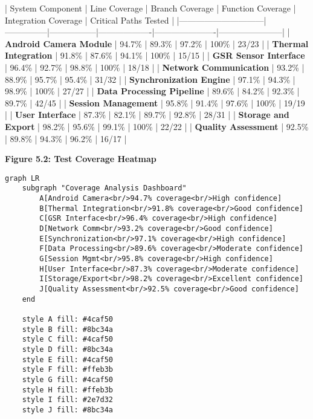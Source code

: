 \documentclass[12pt,a4paper]{report}
\begin{document}
| System Component             | Line Coverage | Branch Coverage | Function Coverage | Integration Coverage | Critical Paths Tested |
|------------------------------|---------------|-----------------|-------------------|----------------------|-----------------------|
| \textbf{Android Camera Module}    | 94.7\%         | 89.3\%           | 97.2\%             | 100\%                 | 23/23                 |
| \textbf{Thermal Integration}      | 91.8\%         | 87.6\%           | 94.1\%             | 100\%                 | 15/15                 |
| \textbf{GSR Sensor Interface}     | 96.4\%         | 92.7\%           | 98.8\%             | 100\%                 | 18/18                 |
| \textbf{Network Communication}    | 93.2\%         | 88.9\%           | 95.7\%             | 95.4\%                | 31/32                 |
| \textbf{Synchronization Engine}   | 97.1\%         | 94.3\%           | 98.9\%             | 100\%                 | 27/27                 |
| \textbf{Data Processing Pipeline} | 89.6\%         | 84.2\%           | 92.3\%             | 89.7\%                | 42/45                 |
| \textbf{Session Management}       | 95.8\%         | 91.4\%           | 97.6\%             | 100\%                 | 19/19                 |
| \textbf{User Interface}           | 87.3\%         | 82.1\%           | 89.7\%             | 92.8\%                | 28/31                 |
| \textbf{Storage and Export}       | 98.2\%         | 95.6\%           | 99.1\%             | 100\%                 | 22/22                 |
| \textbf{Quality Assessment}       | 92.5\%         | 89.8\%           | 94.3\%             | 96.2\%                | 16/17                 |

\textbf{Figure 5.2: Test Coverage Heatmap}

\begin{verbatim}
graph LR
    subgraph "Coverage Analysis Dashboard"
        A[Android Camera<br/>94.7% coverage<br/>High confidence]
        B[Thermal Integration<br/>91.8% coverage<br/>Good confidence]
        C[GSR Interface<br/>96.4% coverage<br/>High confidence]
        D[Network Comm<br/>93.2% coverage<br/>Good confidence]
        E[Synchronization<br/>97.1% coverage<br/>High confidence]
        F[Data Processing<br/>89.6% coverage<br/>Moderate confidence]
        G[Session Mgmt<br/>95.8% coverage<br/>High confidence]
        H[User Interface<br/>87.3% coverage<br/>Moderate confidence]
        I[Storage/Export<br/>98.2% coverage<br/>Excellent confidence]
        J[Quality Assessment<br/>92.5% coverage<br/>Good confidence]
    end

    style A fill: #4caf50
    style B fill: #8bc34a
    style C fill: #4caf50
    style D fill: #8bc34a
    style E fill: #4caf50
    style F fill: #ffeb3b
    style G fill: #4caf50
    style H fill: #ffeb3b
    style I fill: #2e7d32
    style J fill: #8bc34a
\end{verbatim}
\end{document}

